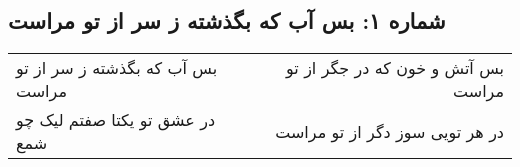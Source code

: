 \begin{center}
\section*{شماره ۱: بس آب که بگذشته ز سر از تو مراست}
\label{sec:001}
\begin{longtable}{l p{0.5cm} r}
بس آب که بگذشته ز سر از تو مراست
&&
بس آتش و خون که در جگر از تو مراست
\\
در عشق تو یکتا صفتم لیک چو شمع
&&
در هر تویی سوز دگر از تو مراست
\\
\end{longtable}
\end{center}
